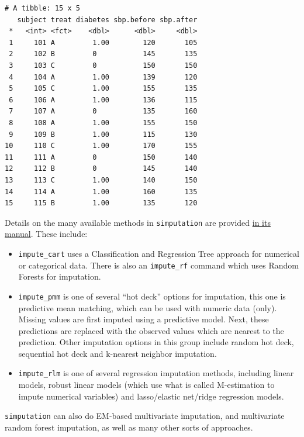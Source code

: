 \documentclass[]{book}
\providecommand{\tightlist}{%
  \setlength{\itemsep}{0pt}\setlength{\parskip}{0pt}}
\theoremstyle{definition}
\theoremstyle{definition}
\theoremstyle{definition}
\theoremstyle{remark}
\begin{document}
\begin{verbatim}
# A tibble: 15 x 5
   subject treat diabetes sbp.before sbp.after
 *   <int> <fct>    <dbl>      <dbl>     <dbl>
 1     101 A         1.00        120       105
 2     102 B         0           145       135
 3     103 C         0           150       150
 4     104 A         1.00        139       120
 5     105 C         1.00        155       135
 6     106 A         1.00        136       115
 7     107 A         0           135       160
 8     108 A         1.00        155       150
 9     109 B         1.00        115       130
10     110 C         1.00        170       155
11     111 A         0           150       140
12     112 B         0           145       140
13     113 C         1.00        140       150
14     114 A         1.00        160       135
15     115 B         1.00        135       120
\end{verbatim}

Details on the many available methods in \texttt{simputation} are
provided
\href{https://cran.r-project.org/web/packages/simputation/simputation.pdf}{in
its manual}. These include:

\begin{itemize}
\tightlist
\item
  \texttt{impute\_cart} uses a Classification and Regression Tree
  approach for numerical or categorical data. There is also an
  \texttt{impute\_rf} command which uses Random Forests for imputation.
\item
  \texttt{impute\_pmm} is one of several ``hot deck'' options for
  imputation, this one is predictive mean matching, which can be used
  with numeric data (only). Missing values are first imputed using a
  predictive model. Next, these predictions are replaced with the
  observed values which are nearest to the prediction. Other imputation
  options in this group include random hot deck, sequential hot deck and
  k-nearest neighbor imputation.
\item
  \texttt{impute\_rlm} is one of several regression imputation methods,
  including linear models, robust linear models (which use what is
  called M-estimation to impute numerical variables) and lasso/elastic
  net/ridge regression models.
\end{itemize}

\texttt{simputation} can also do EM-based multivariate imputation, and
multivariate random forest imputation, as well as many other sorts of
approaches.


\end{document}

